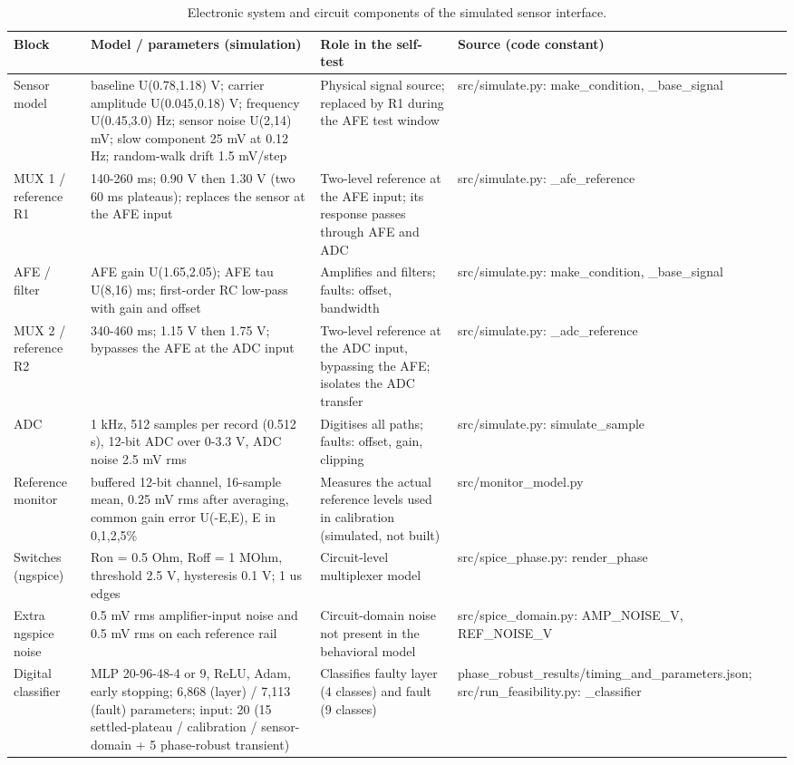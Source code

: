 \begin{table}[H]
\caption{Electronic system and circuit components of the simulated sensor interface.\label{tab:table01_system_components}}
\centering
\footnotesize
\begin{tabular}{p{3.2cm}p{3.6cm}p{3.6cm}p{3.6cm}}
\toprule
\textbf{Block} & \textbf{Model / parameters (simulation)} & \textbf{Role in the self-test} & \textbf{Source (code constant)} \\
\midrule
Sensor model & baseline U(0.78,1.18) V; carrier amplitude U(0.045,0.18) V; frequency U(0.45,3.0) Hz; sensor noise U(2,14) mV; slow component 25 mV at 0.12 Hz; random-walk drift 1.5 mV/step & Physical signal source; replaced by R1 during the AFE test window & src/simulate.py: make\_condition, \_base\_signal \\
MUX 1 / reference R1 & 140-260 ms; 0.90 V then 1.30 V (two 60 ms plateaus); replaces the sensor at the AFE input & Two-level reference at the AFE input; its response passes through AFE and ADC & src/simulate.py: \_afe\_reference \\
AFE / filter & AFE gain U(1.65,2.05); AFE tau U(8,16) ms; first-order RC low-pass with gain and offset & Amplifies and filters; faults: offset, bandwidth & src/simulate.py: make\_condition, \_base\_signal \\
MUX 2 / reference R2 & 340-460 ms; 1.15 V then 1.75 V; bypasses the AFE at the ADC input & Two-level reference at the ADC input, bypassing the AFE; isolates the ADC transfer & src/simulate.py: \_adc\_reference \\
ADC & 1 kHz, 512 samples per record (0.512 s), 12-bit ADC over 0-3.3 V, ADC noise 2.5 mV rms & Digitises all paths; faults: offset, gain, clipping & src/simulate.py: simulate\_sample \\
Reference monitor & buffered 12-bit channel, 16-sample mean, 0.25 mV rms after averaging, common gain error U(-E,E), E in {0,1,2,5}\% & Measures the actual reference levels used in calibration (simulated, not built) & src/monitor\_model.py \\
Switches (ngspice) & Ron = 0.5 Ohm, Roff = 1 MOhm, threshold 2.5 V, hysteresis 0.1 V; 1 us edges & Circuit-level multiplexer model & src/spice\_phase.py: render\_phase \\
Extra ngspice noise & 0.5 mV rms amplifier-input noise and 0.5 mV rms on each reference rail & Circuit-domain noise not present in the behavioral model & src/spice\_domain.py: AMP\_NOISE\_V, REF\_NOISE\_V \\
Digital classifier & MLP 20-96-48-{4 or 9}, ReLU, Adam, early stopping; 6,868 (layer) / 7,113 (fault) parameters; input: 20 (15 settled-plateau / calibration / sensor-domain + 5 phase-robust transient) & Classifies faulty layer (4 classes) and fault (9 classes) & phase\_robust\_results/timing\_and\_parameters.json; src/run\_feasibility.py: \_classifier \\

\end{tabular}
\end{table}
